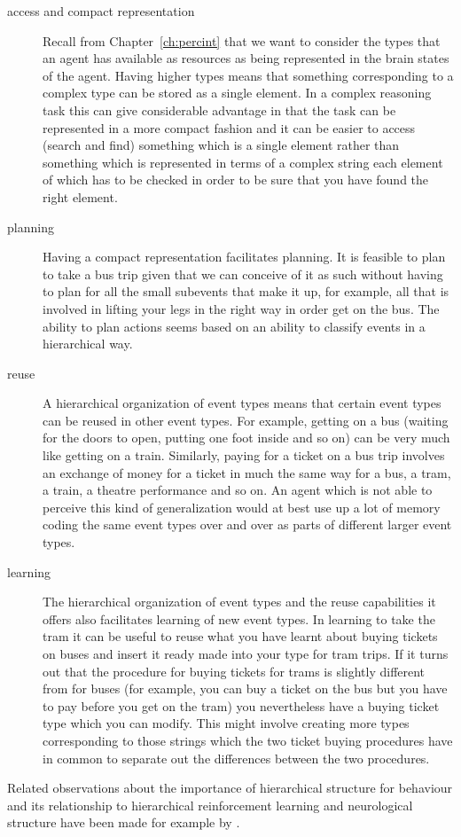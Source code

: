 \begin{description}
\item[access and compact representation] Recall from
  Chapter~\ref{ch:percint} that we want to consider the types that an
  agent has available as resources as being represented in the brain
  states of the agent.  Having higher types means
  that something corresponding to a complex type can be stored as a
  single element.  In a complex reasoning task this can give
  considerable advantage in that the task can be represented in a more
  compact fashion and it can be easier to access (search and find)
  something which is a single element rather than something which is
  represented in terms of a complex string each element of which has
  to be checked in order to be sure that you have found the right element.
\item[planning] Having a compact representation facilitates
  planning.  It is feasible to plan to take a bus trip given that we
  can conceive of it as such without having to plan for all the small
  subevents that make it up, for example, all that is involved in
  lifting your legs in the right way in order get on the bus.  The
  ability to plan actions seems based on an ability to classify events
  in a hierarchical way.
\item[reuse] A hierarchical organization of event types means that
  certain event types can be reused in other event types.  For
  example, getting on a bus (waiting for the doors to open, putting
  one foot inside and so on) can be very much like getting on a
  train.  Similarly, paying for a ticket on a bus trip involves an
  exchange of money for a ticket in much the same way for a bus, a
  tram, a train, a theatre performance and so on.  An agent which is
  not able to perceive this kind of generalization would at best use
  up a lot of memory coding the same event types over and over as
  parts of different larger event types.
\item[learning] The hierarchical organization of event types and the reuse
  capabilities it offers also facilitates learning of new event
  types.  In learning to take the tram it can be useful to reuse what
  you have learnt about buying tickets on buses and insert it ready
  made into your type for tram trips.  If it turns out that the
  procedure for buying tickets for trams is slightly different from
  for buses (for example, you can buy a ticket on the bus but you have
  to pay before you get on the tram) you nevertheless have a buying
  ticket type which you can modify.  This might involve creating more
  types corresponding to those strings which the two ticket buying
  procedures have in common to separate out the differences between
  the two procedures. 

\end{description}   
Related observations about the importance of hierarchical structure
for behaviour and its relationship to hierarchical reinforcement
learning and neurological structure have been
made for example by
\cite{Botvinick2008,BotvinickNivBarto2009,Ribas-FernandesSolwayDiukMcGuireBartoNivBotvinick2011}.

